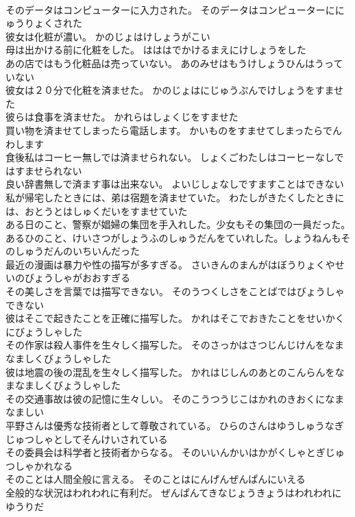 \documentclass[8pt]{extreport}
\begin{document}
\begin{CJK}{UTF8}{min}
\\	そのデータはコンピューターに入力された。	そのデータはコンピューターににゅうりょくされた 
\\	彼女は化粧が濃い。	かのじょはけしょうがこい 
\\	母は出かける前に化粧をした。	はははでかけるまえにけしょうをした 
\\	あの店ではもう化粧品は売っていない。	あのみせはもうけしょうひんはうっていない 
\\	彼女は２０分で化粧を済ませた。	かのじょはにじゅうぷんでけしょうをすませた 
\\	彼らは食事を済ませた。	かれらはしょくじをすませた 
\\	買い物を済ませてしまったら電話します。	かいものをすませてしまったらでんわします 
\\	食後私はコーヒー無しでは済ませられない。	しょくごわたしはコーヒーなしではすませられない 
\\	良い辞書無しで済ます事は出来ない。	よいじしょなしですますことはできない 
\\	私が帰宅したときには、弟は宿題を済ませていた。	わたしがきたくしたときには、おとうとはしゅくだいをすませていた 
\\	ある日のこと、警察が娼婦の集団を手入れした。少女もその集団の一員だった。	あるひのこと、けいさつがしょうふのしゅうだんをていれした。しょうねんもそのしゅうだんのいちいんだった 
\\	最近の漫画は暴力や性の描写が多すぎる。	さいきんのまんがはぼうりょくやせいのびょうしゃがおおすぎる 
\\	その美しさを言葉では描写できない。	そのうつくしさをことばではびょうしゃできない 
\\	彼はそこで起きたことを正確に描写した。	かれはそこでおきたことをせいかくにびょうしゃした 
\\	その作家は殺人事件を生々しく描写した。	そのさっかはさつじんじけんをなまなましくびょうしゃした 
\\	彼は地震の後の混乱を生々しく描写した。	かれはじしんのあとのこんらんをなまなましくびょうしゃした 
\\	その交通事故は彼の記憶に生々しい。	そのこうつうじこはかれのきおくになまなましい 
\\	平野さんは優秀な技術者として尊敬されている。	ひらのさんはゆうしゅうなぎじゅつしゃとしてそんけいされている 
\\	その委員会は科学者と技術者からなる。	そのいいんかいはかがくしゃとぎじゅつしゃかれなる 
\\	そのことは人間全般に言える。	そのことはにんげんぜんぱんにいえる 
\\	全般的な状況はわれわれに有利だ。	ぜんぱんてきなじょうきょうはわれわれにゆうりだ 

\end{CJK}
\end{document}

